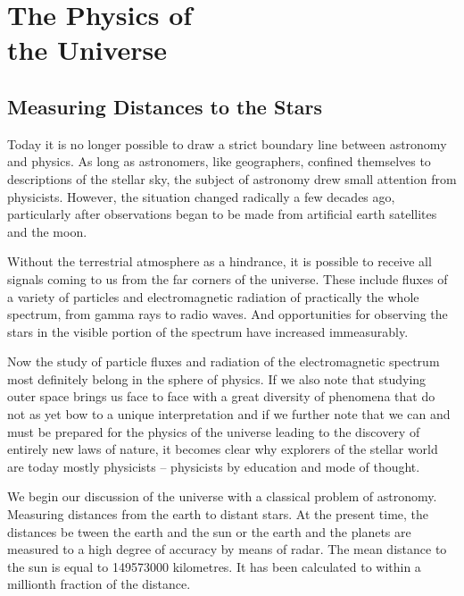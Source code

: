 

\cleardoublepage
\chapter[The Physics of the Universe]{The Physics of \\the Universe}
\label{ch-07}

\section{Measuring Distances to the Stars}

Today it is no longer possible to draw a strict boundary line between astronomy and physics. As long as astrono­mers, like geographers, confined themselves to descriptions of the stellar sky, the subject of astronomy drew small attention from physicists. However, the situation changed radically a few decades ago, particularly after observations began to be made from artificial earth satellites and the moon.

Without the terrestrial atmosphere as a hindrance, it is possible to receive all signals coming to us from the far corners of the universe. These include fluxes of a va­riety of particles and electromagnetic radiation of practi­cally the whole spectrum, from gamma rays to radio waves. And opportunities for observing the stars in the visible portion of the spectrum have increased immeasur­ably.

Now the study of particle fluxes and radiation of the electromagnetic spectrum most definitely belong in the sphere of physics. If we also note that studying outer space brings us face to face with a great diversity of phenomena that do not as yet bow to a unique interpre­tation and if we further note that we can and must be prepared for the physics of the universe leading to the discovery of entirely new laws of nature, it becomes clear why explorers of the stellar world are today mostly
physicists -- physicists by education and mode of thought.

We begin our discussion of the universe with a classical problem of astronomy. Measuring distances from the earth to distant stars. At the present time, the distances be­ tween the earth and the sun or the earth and the planets are measured to a high degree of accuracy by means of radar. The mean distance to the sun is equal to \num{149573000} kilometres. It has been calculated to within a millionth fraction of the distance.

